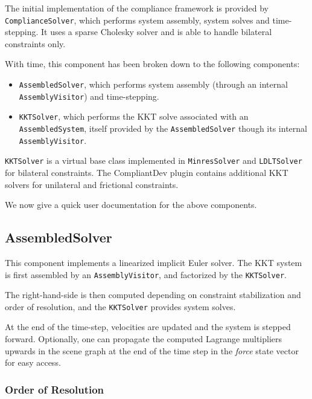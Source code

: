 \newcommand{\component}[1]{\texttt{#1}}
\newcommand{\compopt}[2]{\texttt{#1}=''#2''\\}

The initial implementation of the compliance framework is provided by
\component{ComplianceSolver}, which performs system assembly, system
solves and time-stepping. It uses a sparse Cholesky solver and is able
to handle bilateral constraints only.

With time, this component has been broken down to the following
components:

\begin{itemize}
\item \component{AssembledSolver}, which performs system assembly
  (through an internal \component{AssemblyVisitor}) and
  time-stepping.
\item \component{KKTSolver}, which performs the KKT solve associated
  with an \component{AssembledSystem}, itself provided by the
  \component{AssembledSolver} though its internal
  \component{AssemblyVisitor}. 
\end{itemize}

\component{KKTSolver} is a virtual base class implemented in
\component{MinresSolver} and \component{LDLTSolver} for bilateral
constraints. The CompliantDev plugin contains additional KKT solvers
for unilateral and frictional constraints.

We now give a quick user documentation for the above components.

\subsection{AssembledSolver}

This component implements a linearized implicit Euler solver. The KKT
system is first assembled by an \component{AssemblyVisitor}, and
factorized by the \component{KKTSolver}.

The right-hand-side is then computed depending on constraint
stabilization and order of resolution, and the \component{KKTSolver}
provides system solves.

At the end of the time-step, velocities are updated and the system is
stepped forward. Optionally, one can propagate the computed Lagrange
multipliers upwards in the scene graph at the end of the time step in
the \emph{force} state vector for easy access.

\subsubsection{Order of Resolution}

